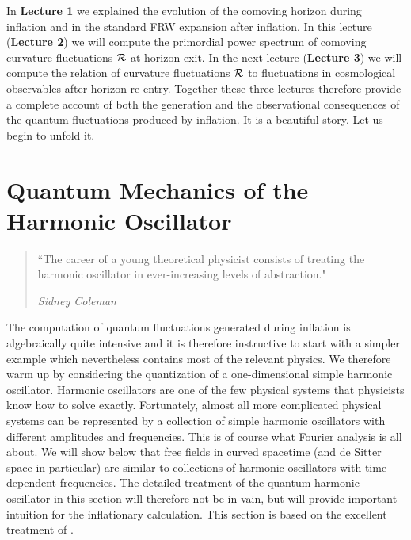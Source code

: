 \documentclass[12pt,letterpaper,rotate]{article}
\def\R{{\cal R}}
\begin{document}
{%


In {\bf Lecture 1} we explained the evolution of the comoving horizon during inflation and in the standard FRW expansion after inflation. 
In this lecture ({\bf Lecture 2}) we will compute the primordial power spectrum of comoving curvature fluctuations $\R$ at horizon exit.
In the next lecture ({\bf Lecture 3}) we will compute the relation of curvature fluctuations $\R$ to fluctuations in cosmological observables after horizon re-entry.
 Together these three lectures therefore provide a complete account of both the generation and the observational consequences of the quantum fluctuations produced by inflation.
 It is a beautiful story. Let us begin to unfold it.

\section{Quantum Mechanics of the %
Harmonic Oscillator}
\label{sec:SHO}

\begin{quote}
``The career of a young theoretical physicist consists of treating the harmonic oscillator in ever-increasing levels of abstraction."

{\it Sidney Coleman}
\end{quote}

The computation of quantum fluctuations generated during inflation is algebraically quite intensive and it is therefore instructive to start with a simpler example which nevertheless contains most of the relevant physics. We therefore warm up by considering the quantization of a one-dimensional simple harmonic oscillator. 
  Harmonic oscillators are one of the few physical systems that physicists know how to solve exactly. Fortunately, almost all more complicated physical systems can be represented by a collection of simple harmonic oscillators with different amplitudes and frequencies.
This is of course what Fourier analysis is all about.  
We will show below that free fields in curved spacetime (and de Sitter space in particular) are similar to collections of harmonic oscillators with time-dependent frequencies. The detailed treatment of the quantum harmonic oscillator in this section will therefore not be in vain, but will provide important intuition for the inflationary calculation. This section is based on the excellent treatment of \cite{Jacobson:2003vx}.

}
\end{document}
